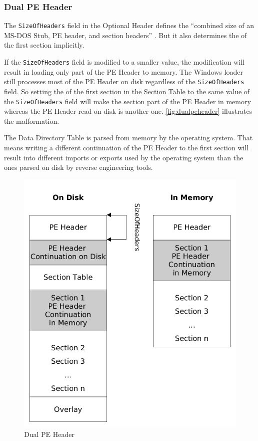 \subsubsection*{Dual PE Header} \label{subsubsec:dualheader}

The \texttt{SizeOfHeaders} field in the Optional Header defines the \enquote{combined size of an MS-DOS Stub, PE header, and section headers} \cite[]{pespec}. But it also determines the \VA{} of the first section implicitly. \cite[slide 15]{vuksan11} 

If the \texttt{SizeOfHeaders} field is modified to a smaller value, the modification will result in loading only part of the PE Header to memory. The Windows loader still processes most of the PE Header on disk regardless of the \texttt{SizeOfHeaders} field. So setting the \VA{} of the first section in the Section Table to the same value of the \texttt{SizeOfHeaders} field will make the section part of the PE Header in memory whereas the PE Header read on disk is another one. \autoref{fig:dualpeheader} illustrates the malformation.

The Data Directory Table is parsed from memory by the operating system. That means writing a different continuation of the PE Header to the first section will result into \eg{} different imports or exports used by the operating system than the ones parsed on disk by reverse engineering tools.

\begin{figure}
\includegraphics[width=.98\textwidth, height=.60\textheight,keepaspectratio]{graphics/dualpeheader}
\caption{Dual PE Header}
\label{fig:dualpeheader} 
\end{figure}

